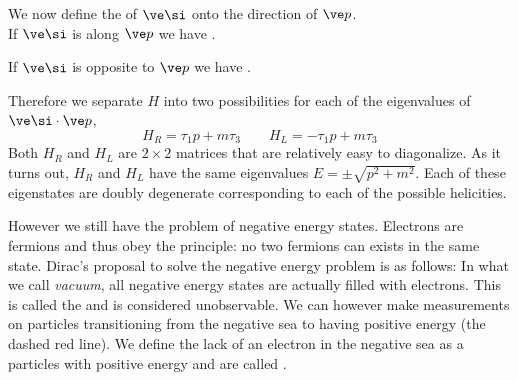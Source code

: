 \documentclass{article}
\begin{document}
We now define the  of $\ve \si$ onto the direction of $\ve p$.\\

If $\ve \si$ is along $\ve p$ we have .
\begin{center}
\end{center}

If $\ve \si$ is opposite to $\ve p$ we have .
\begin{center}
\end{center}
Therefore we separate $H$ into two possibilities for each of the eigenvalues of $\ve \si \cdot \ve p$,
\[ H_{R} = \tau_1 p + m \tau_3 \qquad H_{L} = -\tau_1 p + m \tau_3 \]
Both $H_{R}$ and $H_{L}$ are $2 \times 2$ matrices that are relatively easy to diagonalize. As it turns out, $H_{R}$ and $H_{L}$ have the same eigenvalues $E = \pm \sqrt{p^2 + m^2}$. Each of these eigenstates are doubly degenerate corresponding to each of the possible helicities.

\begin{center}
\end{center}

However we still have the problem of negative energy states. Electrons are fermions and thus obey the  principle: no two fermions can exists in the same state. Dirac's proposal to solve the negative energy problem is as follows: In what we call \textit{vacuum}, all negative energy states are actually filled with electrons. This is called the  and is considered unobservable. We can however make measurements on particles transitioning from the negative sea to having positive energy (the dashed red line). We define the lack of an electron in the negative sea as a particles with positive energy and are called .
\end{document}
